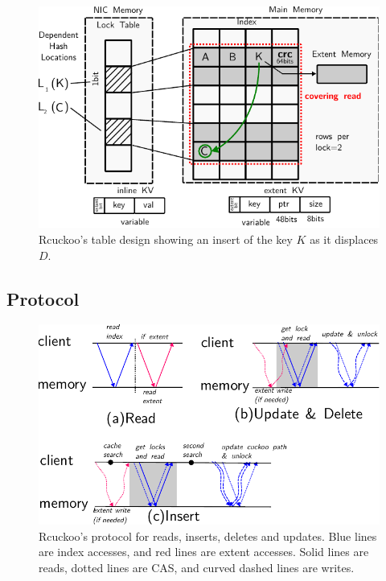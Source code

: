\begin{figure}[t]
    \includegraphics[width=0.99\linewidth]{fig/table-diagram.pdf}
    \caption{Rcuckoo's table design showing an insert of the key $K$ as it displaces $D$.}
    \label{fig:table-diagram}
\end{figure}


\subsection{Protocol}

\begin{figure}[t]
\includegraphics[width=0.99\linewidth]{fig/message_diagram.pdf}

\caption{Rcuckoo's protocol for reads, inserts, deletes and
updates. Blue lines are index accesses, and red lines are
extent accesses. Solid lines are reads, dotted lines are
CAS, and curved dashed lines are writes.}

\label{fig:message_diagram}
\end{figure}

